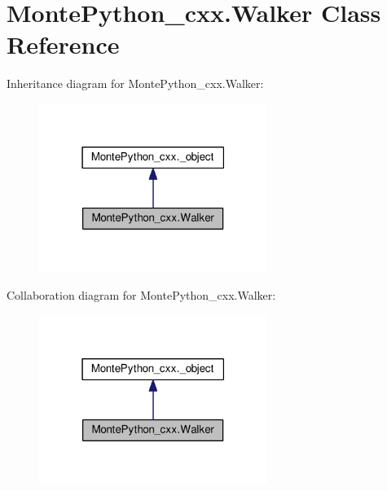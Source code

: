 \hypertarget{classMontePython__cxx_1_1Walker}{}\section{Monte\+Python\+\_\+cxx.\+Walker Class Reference}
\label{classMontePython__cxx_1_1Walker}


Inheritance diagram for Monte\+Python\+\_\+cxx.\+Walker\+:
\nopagebreak
\begin{figure}[H]
\begin{center}
\leavevmode
\includegraphics[width=210pt]{classMontePython__cxx_1_1Walker__inherit__graph}
\end{center}
\end{figure}


Collaboration diagram for Monte\+Python\+\_\+cxx.\+Walker\+:
\nopagebreak
\begin{figure}[H]
\begin{center}
\leavevmode
\includegraphics[width=210pt]{classMontePython__cxx_1_1Walker__coll__graph}
\end{center}
\end{figure}
